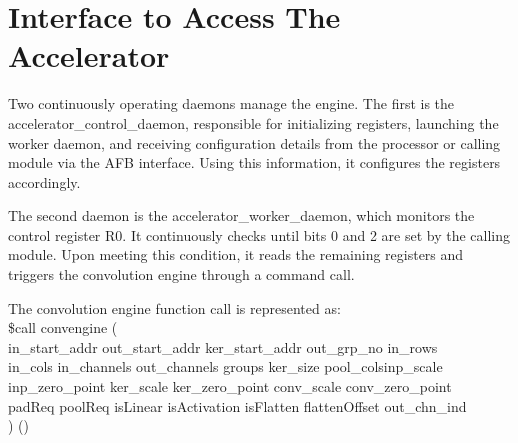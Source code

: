\section{Interface to Access The Accelerator}
Two continuously operating daemons manage the engine. The first is the accelerator\_control\_daemon, responsible for initializing registers, launching the worker daemon, and receiving configuration details from the processor or calling module via the AFB interface. Using this information, it configures the registers accordingly.

The second daemon is the accelerator\_worker\_daemon, which monitors the control register R0. It continuously checks until bits 0 and 2 are set by the calling module. Upon meeting this condition, it reads the remaining registers and triggers the convolution engine through a command call.

The convolution engine function call is represented as:\\
\$call convengine (\\
\hspace*{1cm} in\_start\_addr \quad out\_start\_addr \quad  ker\_start\_addr \quad out\_grp\_no \quad in\_rows\\
\hspace*{1cm} in\_cols \quad in\_channels \quad  out\_channels \quad groups \quad ker\_size \quad pool\_cols\quad inp\_scale \\
\hspace*{1cm} inp\_zero\_point \quad ker\_scale \quad  ker\_zero\_point \quad conv\_scale \quad conv\_zero\_point\\
\hspace*{1cm} padReq \quad poolReq \quad  isLinear \quad isActivation \quad isFlatten \quad flattenOffset \quad out\_chn\_ind\\
\hspace*{1cm} ) \quad ()

